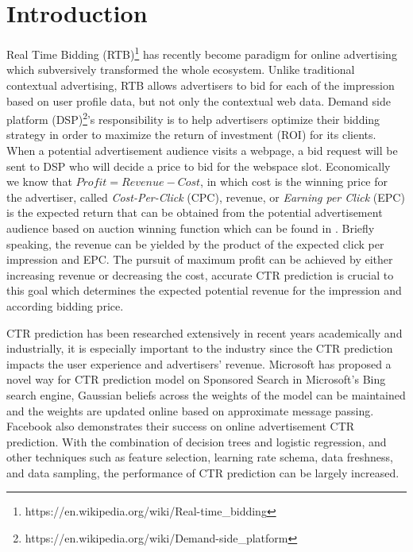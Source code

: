 \chapter{Introduction}
\label{chapterlabel1}

Real Time Bidding (RTB)\footnote{https://en.wikipedia.org/wiki/Real-time_bidding} has recently become paradigm for online advertising which subversively transformed the whole ecosystem. Unlike traditional contextual advertising, RTB allows advertisers to bid for each of the impression based on user profile data, but not only the contextual web data. Demand side platform (DSP)\footnote{https://en.wikipedia.org/wiki/Demand-side_platform}'s responsibility is to help advertisers optimize their bidding strategy in order to maximize the return of investment (ROI) for its clients. When a potential advertisement audience visits a webpage, a bid request will be sent to DSP who will decide a price to bid for the webspace slot. Economically we know that \(Profit = Revenue - Cost\), in which cost is the winning price for the advertiser, called \textit{Cost-Per-Click} (CPC), revenue, or \textit{Earning per Click} (EPC) is the expected return that can be obtained from the potential advertisement audience based on auction winning function which can be found in \cite{zhang2014optimal}. Briefly speaking, the revenue can be yielded by the product of the expected click per impression and EPC. The pursuit of maximum profit can be achieved by either increasing revenue or decreasing the cost, accurate CTR prediction is crucial to this goal which determines the expected potential revenue for the impression and according bidding price. 

CTR prediction has been researched extensively in recent years academically and industrially, it is especially important to the industry since the CTR prediction impacts the user experience and advertisers' revenue. Microsoft \cite{graepel2010web} has proposed a novel way for CTR prediction model on Sponsored Search in Microsoft’s Bing search engine, Gaussian beliefs across the weights of the model can be maintained and the weights are updated online based on approximate message passing. Facebook \cite{he2014practical} also demonstrates their success on online advertisement CTR prediction. With the combination of decision trees and logistic regression, and other techniques such as feature selection, learning rate schema, data freshness, and data sampling, the performance of CTR prediction can be largely increased.  

